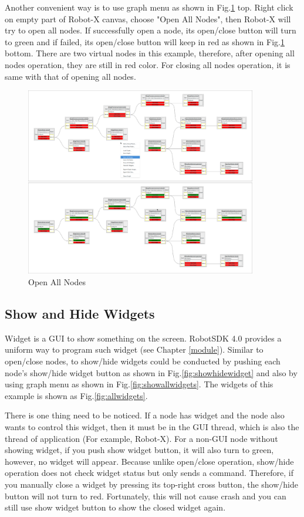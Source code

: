 \documentclass[a4paper,10pt]{book}
\begin{document}
Another convenient way is to use graph menu as shown in Fig.\ref{fig:openallnodes} top. Right click on empty part of Robot-X canvas, choose "Open All Nodes", then Robot-X will try to open all nodes. If successfully open a node, its open/close button will turn to green and if failed, its open/close button will keep in red as shown in Fig.\ref{fig:openallnodes} bottom. There are two virtual nodes in this example, therefore, after opening all nodes operation, they are still in red color. For closing all nodes operation, it is same with that of opening all nodes.

\begin{figure}
 \centering
 \includegraphics[width=0.9\textwidth]{img/openallnodes.eps}
 \caption{Open All Nodes}
 \label{fig:openallnodes}
\end{figure}

\subsection{Show and Hide Widgets}

Widget is a GUI to show something on the screen. RobotSDK 4.0 provides a uniform way to program such widget (see Chapter \ref{module}). Similar to open/close nodes, to show/hide widgets could be conducted by pushing each node's show/hide widget button as shown in Fig.\ref{fig:showhidewidget} and also by using graph menu as shown in Fig.\ref{fig:showallwidgets}. The widgets of this example is shown as Fig.\ref{fig:allwidgets}.

There is one thing need to be noticed. If a node has widget and the node also wants to control this widget, then it must be in the GUI thread, which is also the thread of application (For example, Robot-X). For a non-GUI node without showing widget, if you push show widget button, it will also turn to green, however, no widget will appear. Because unlike open/close operation, show/hide operation does not check widget status but only sends a command. Therefore, if you manually close a widget by pressing its top-right cross button, the show/hide button will not turn to red. Fortunately, this will not cause crash and you can still use show widget button to show the closed widget again.
\end{document}
